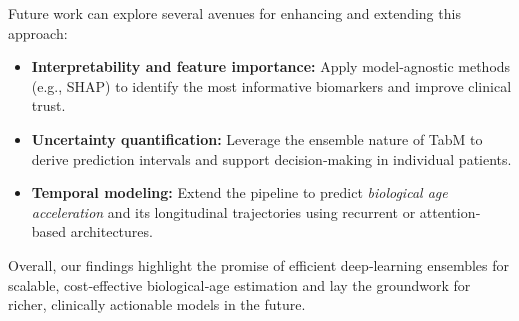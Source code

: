 \documentclass[manuscript,screen,review]{acmart}
\begin{document}
Future work can explore several avenues for enhancing and extending this approach:
\begin{itemize}
  \item \textbf{Interpretability and feature importance:} Apply model‐agnostic methods (e.g., SHAP) to identify the most informative biomarkers and improve clinical trust.
  \item \textbf{Uncertainty quantification:} Leverage the ensemble nature of TabM to derive prediction intervals and support decision‐making in individual patients.
  \item \textbf{Temporal modeling:} Extend the pipeline to predict \emph{biological age acceleration} and its longitudinal trajectories using recurrent or attention‐based architectures.
\end{itemize}

Overall, our findings highlight the promise of efficient deep‐learning ensembles for scalable, cost‐effective biological‐age estimation and lay the groundwork for richer, clinically actionable models in the future.
\end{document}

